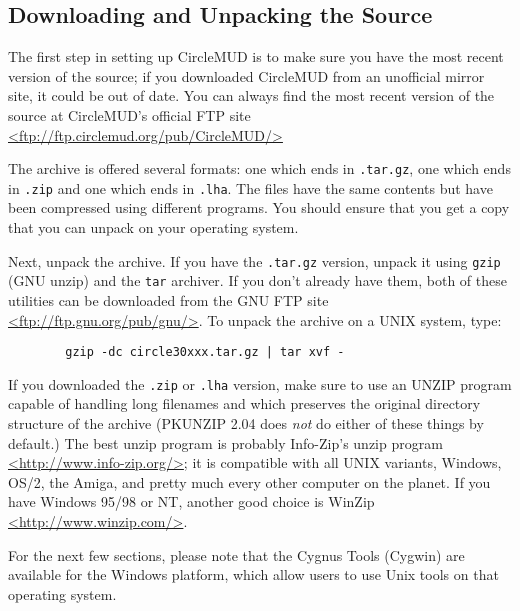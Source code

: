 \documentclass[11pt]{article}
\begin{document}
\subsection{Downloading and Unpacking the Source}
The first step in setting up CircleMUD is to make sure you have the most recent version of the source; if you downloaded CircleMUD from an unofficial mirror site, it could be out of date.  You can always find the most recent version of the source at CircleMUD's official FTP site \url{<ftp://ftp.circlemud.org/pub/CircleMUD/>}
\par
The archive is offered several formats: one which ends in \texttt{.tar.gz}, one which ends in \texttt{.zip} and one which ends in \texttt{.lha}.  The files have the same contents but have been compressed using different programs.  You should ensure that you get a copy that you can unpack on your operating system.
\par
Next, unpack the archive.  If you have the \texttt{.tar.gz} version, unpack it using \texttt{gzip} (GNU unzip) and the \texttt{tar} archiver.  If you don't already have them, both of these utilities can be downloaded from the GNU FTP site \url{<ftp://ftp.gnu.org/pub/gnu/>}. To unpack the archive on a UNIX system, type: 
\begin{verbatim}
        gzip -dc circle30xxx.tar.gz | tar xvf -
\end{verbatim}
\par
If you downloaded the \texttt{.zip} or \texttt{.lha} version, make sure to use an UNZIP program capable of handling long filenames and which preserves the original directory structure of the archive (PKUNZIP 2.04 does {\em not} do either of these things by default.) The best unzip program is probably Info-Zip's unzip program \url{<http://www.info-zip.org/>}; it is compatible with all UNIX variants, Windows, OS/2, the Amiga, and pretty much every other computer on the planet.  If you have Windows 95/98 or NT, another good choice is WinZip \url{<http://www.winzip.com/>}.
\par
For the next few sections, please note that the Cygnus Tools (Cygwin) are available for the Windows platform, which allow users to use Unix tools on that operating system.
\end{document}
